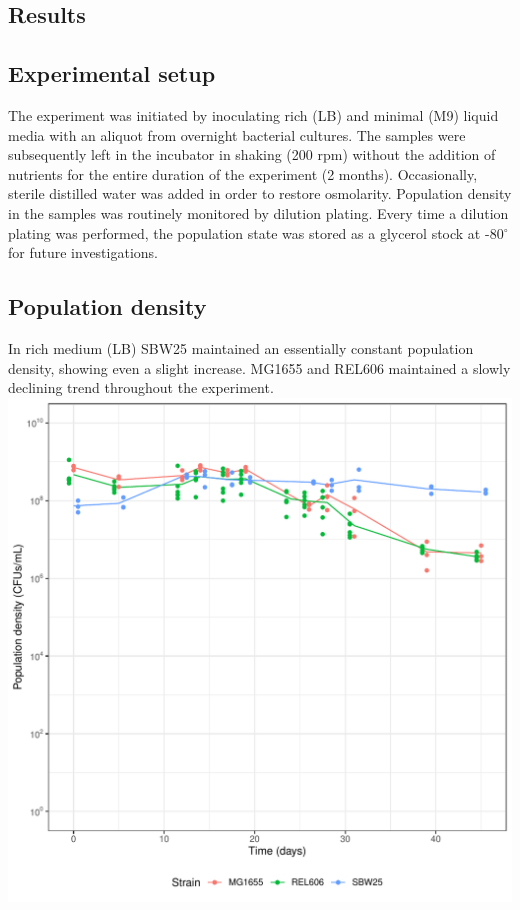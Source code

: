 \documentclass[
    11pt,
    a4paper,
    twoside
]{article} %
\begin{document}
\begin{multicols}{2}
\section*{Results}
\subsection*{Experimental setup}
The experiment was initiated by inoculating rich (LB) and minimal (M9) liquid media with an aliquot from overnight bacterial cultures.
The samples were subsequently left in the incubator in shaking (200 rpm) without the addition of nutrients for the entire duration of the experiment (2 months).
Occasionally, sterile distilled water was added in order to restore osmolarity.
Population density in the samples was routinely monitored by dilution plating.
Every time a dilution plating was performed, the population state was stored as a glycerol stock at -80$^\circ$ for future investigations.

\subsection*{Population density}
In rich medium (LB) SBW25 maintained an essentially constant population density, showing even a slight increase.
MG1655 and REL606 maintained a slowly declining trend throughout the experiment.
\\[2ex]
\includegraphics[width=\columnwidth]{mean_plot_LB.pdf}
\vspace{2ex}


\end{multicols}
\end{document}
